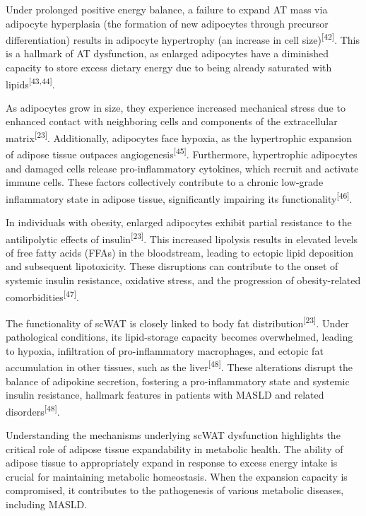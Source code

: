 \documentclass[
  11pt,
  letterpaper,
]{book}
\begin{document}
Under prolonged positive energy balance, a failure to expand AT mass via
adipocyte hyperplasia (the formation of new adipocytes through precursor
differentiation) results in adipocyte hypertrophy (an increase in cell
size)\textsuperscript{{[}42{]}}. This is a hallmark of AT dysfunction,
as enlarged adipocytes have a diminished capacity to store excess
dietary energy due to being already saturated with
lipids\textsuperscript{{[}43,44{]}}.

As adipocytes grow in size, they experience increased mechanical stress
due to enhanced contact with neighboring cells and components of the
extracellular matrix\textsuperscript{{[}23{]}}. Additionally, adipocytes
face hypoxia, as the hypertrophic expansion of adipose tissue outpaces
angiogenesis\textsuperscript{{[}45{]}}. Furthermore, hypertrophic
adipocytes and damaged cells release pro-inflammatory cytokines, which
recruit and activate immune cells. These factors collectively contribute
to a chronic low-grade inflammatory state in adipose tissue,
significantly impairing its functionality\textsuperscript{{[}46{]}}.

In individuals with obesity, enlarged adipocytes exhibit partial
resistance to the antilipolytic effects of
insulin\textsuperscript{{[}23{]}}. This increased lipolysis results in
elevated levels of free fatty acids (FFAs) in the bloodstream, leading
to ectopic lipid deposition and subsequent lipotoxicity. These
disruptions can contribute to the onset of systemic insulin resistance,
oxidative stress, and the progression of obesity-related
comorbidities\textsuperscript{{[}47{]}}.

The functionality of scWAT is closely linked to body fat
distribution\textsuperscript{{[}23{]}}. Under pathological conditions,
its lipid-storage capacity becomes overwhelmed, leading to hypoxia,
infiltration of pro-inflammatory macrophages, and ectopic fat
accumulation in other tissues, such as the
liver\textsuperscript{{[}48{]}}. These alterations disrupt the balance
of adipokine secretion, fostering a pro-inflammatory state and systemic
insulin resistance, hallmark features in patients with MASLD and related
disorders\textsuperscript{{[}48{]}}.

Understanding the mechanisms underlying scWAT dysfunction highlights the
critical role of adipose tissue expandability in metabolic health. The
ability of adipose tissue to appropriately expand in response to excess
energy intake is crucial for maintaining metabolic homeostasis. When the
expansion capacity is compromised, it contributes to the pathogenesis of
various metabolic diseases, including MASLD.
\end{document}
